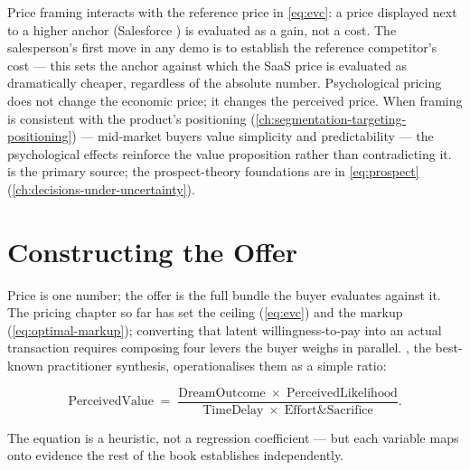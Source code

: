 Price framing interacts with the reference price in \cref{eq:evc}: a price displayed next to a higher anchor (Salesforce ) is evaluated as a gain, not a cost. The salesperson's first move in any demo is to establish the reference competitor's cost --- this sets the anchor against which the SaaS price is evaluated as dramatically cheaper, regardless of the absolute number. Psychological pricing does not change the economic price; it changes the perceived price. When framing is consistent with the product's positioning (\cref{ch:segmentation-targeting-positioning}) --- mid-market buyers value simplicity and predictability --- the psychological effects reinforce the value proposition rather than contradicting it. \textcite{thaler1985mental} is the primary source; the prospect-theory foundations are in \cref{eq:prospect} (\cref{ch:decisions-under-uncertainty}).

\section{Constructing the Offer}\label{sec:offer-construction}

Price is one number; the offer is the full bundle the buyer evaluates against it. The pricing chapter so far has set the ceiling (\cref{eq:evc}) and the markup (\cref{eq:optimal-markup}); converting that latent willingness-to-pay into an actual transaction requires composing four levers the buyer weighs in parallel. \textcite{hormozi2021offers}, the best-known practitioner synthesis, operationalises them as a simple ratio:

\begin{equation}\label{eq:value-equation}
  \mathrm{PerceivedValue}
  \;=\;
  \frac{\mathrm{DreamOutcome}\;\times\;\mathrm{PerceivedLikelihood}}
       {\mathrm{TimeDelay}\;\times\;\mathrm{Effort \& Sacrifice}}.
\end{equation}

The equation is a heuristic, not a regression coefficient --- but each variable maps onto evidence the rest of the book establishes independently.

